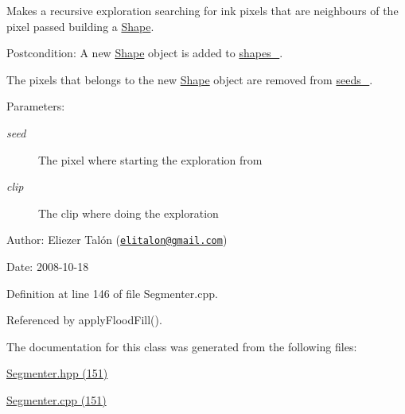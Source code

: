 Makes a recursive exploration searching for ink pixels that are neighbours of the pixel passed building a \hyperlink{class_shape}{Shape}. 

\begin{Desc}
\item[Postcondition:]A new \hyperlink{class_shape}{Shape} object is added to \hyperlink{class_segmenter_3040cc000907ef44e820ddcf70de6f08}{shapes\_\-}. 

The pixels that belongs to the new \hyperlink{class_shape}{Shape} object are removed from \hyperlink{class_segmenter_48b7c2c842b26bebda9d0fc13cf81e58}{seeds\_\-}.\end{Desc}
\begin{Desc}
\item[Parameters:]
\begin{description}
\item[{\em seed}]The pixel where starting the exploration from \item[{\em clip}]The clip where doing the exploration\end{description}
\end{Desc}
\begin{Desc}
\item[Author:]Eliezer Talón (\href{mailto:elitalon@gmail.com}{\tt elitalon@gmail.com}) \end{Desc}
\begin{Desc}
\item[Date:]2008-10-18 \end{Desc}


Definition at line 146 of file Segmenter.cpp.

Referenced by applyFloodFill().

The documentation for this class was generated from the following files:\begin{CompactItemize}
\item 
\hyperlink{_segmenter_8hpp}{Segmenter.hpp (151)}\item 
\hyperlink{_segmenter_8cpp}{Segmenter.cpp (151)}\end{CompactItemize}
